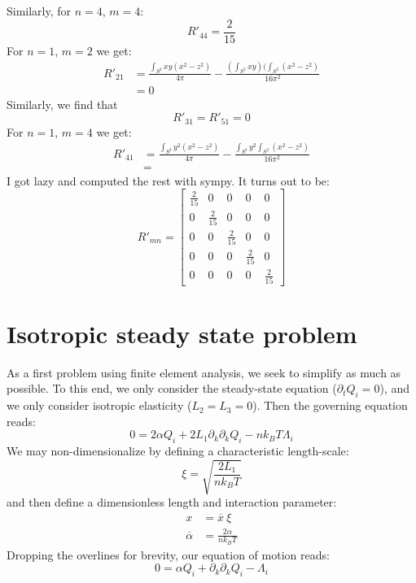 \documentclass[reqno]{article}
\begin{document}
	Similarly, for $n = 4$, $m = 4$:
	\begin{equation}
		R'_{44} = \frac{2}{15}
	\end{equation}
	For $n = 1$, $m = 2$ we get:
	\begin{equation}
	\begin{split}
		R'_{21}
		&= \frac{\int_{S^2} xy (x^2 - z^2)}{4 \pi}
		- \frac{(\int_{S^2} xy)(\int_{S^2} (x^2 - z^2)}{16 \pi^2} \\
		&= 0
	\end{split}
	\end{equation}
	Similarly, we find that
	\begin{equation}
		R'_{31} = R'_{51} = 0
	\end{equation}
	For $n = 1$, $m = 4$ we get:
	\begin{equation}
	\begin{split}
		R'_{41}
		&= \frac{\int_{S^2} y^2 (x^2 - z^2)}{4\pi}
		- \frac{\int_{S^2} y^2 \int_{S^2} (x^2 - z^2)}{16 \pi^2} \\
		&= 
	\end{split}
	\end{equation}
	I got lazy and computed the rest with sympy.
	It turns out to be:
	\begin{equation}
		R'_{mn}
		=
		\begin{bmatrix}
			\frac{2}{15} &0 &0 &0 &0 \\
			0 &\frac{2}{15} &0 &0 &0 \\
			0 &0 &\frac{2}{15} &0 &0 \\
			0 &0 &0 &\frac{2}{15} &0 \\
			0 &0 &0 &0 &\frac{2}{15}
		\end{bmatrix}
	\end{equation}
	
	\section{Isotropic steady state problem} \label{iso-steady-state}
	As a first problem using finite element analysis, we seek to simplify as much as possible.
	To this end, we only consider the steady-state equation ($\partial_t Q_i = 0$), and we only consider isotropic elasticity ($L_2 = L_3 = 0$).
	Then the governing equation reads:
	\begin{equation}
		0
		= 2 \alpha Q_i
		+ 2 L_1 \partial_k \partial_k Q_i
		- n k_B T \Lambda_i
	\end{equation}
	We may non-dimensionalize by defining a characteristic length-scale:
	\begin{equation}
		\xi = \sqrt{\frac{2 L_1}{n k_B T}}
	\end{equation}
	and then define a dimensionless length and interaction parameter:
	\begin{align}
		x &= \overline{x} \: \xi \\
		\overline{\alpha} &= \frac{2 \alpha}{n k_B T}
	\end{align}
	Dropping the overlines for brevity, our equation of motion reads:
	\begin{equation}
		0 = \alpha Q_i + \partial_k \partial_k Q_i - \Lambda_i
	\end{equation}
	
\end{document}
